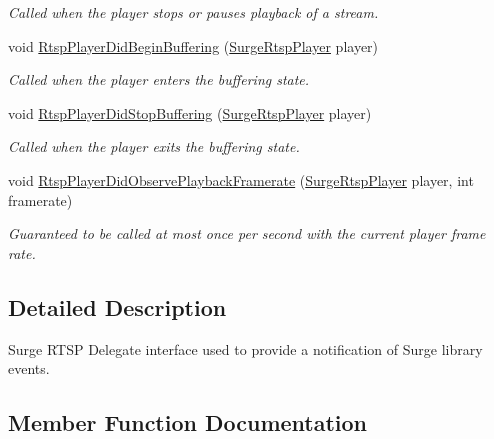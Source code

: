 \begin{DoxyCompactItemize}
\begin{DoxyCompactList}\small\item\em Called when the player stops or pauses playback of a stream. \end{DoxyCompactList}\item 
void \hyperlink{interface_surge_xamarini_o_s_bindings_1_1_surge_rtsp_player_delegate_a60aaf86b1f006e37c387d6dbe710977f}{Rtsp\+Player\+Did\+Begin\+Buffering} (\hyperlink{interface_surge_xamarini_o_s_bindings_1_1_surge_rtsp_player}{Surge\+Rtsp\+Player} player)
\begin{DoxyCompactList}\small\item\em Called when the player enters the buffering state. \end{DoxyCompactList}\item 
void \hyperlink{interface_surge_xamarini_o_s_bindings_1_1_surge_rtsp_player_delegate_ac178f502817c60bfe3a57b7393d66232}{Rtsp\+Player\+Did\+Stop\+Buffering} (\hyperlink{interface_surge_xamarini_o_s_bindings_1_1_surge_rtsp_player}{Surge\+Rtsp\+Player} player)
\begin{DoxyCompactList}\small\item\em Called when the player exits the buffering state. \end{DoxyCompactList}\item 
void \hyperlink{interface_surge_xamarini_o_s_bindings_1_1_surge_rtsp_player_delegate_a96ebb6b82e20ba68d1b91bee632efd06}{Rtsp\+Player\+Did\+Observe\+Playback\+Framerate} (\hyperlink{interface_surge_xamarini_o_s_bindings_1_1_surge_rtsp_player}{Surge\+Rtsp\+Player} player, int framerate)
\begin{DoxyCompactList}\small\item\em Guaranteed to be called at most once per second with the current player frame rate. \end{DoxyCompactList}\end{DoxyCompactItemize}


\subsection{Detailed Description}
Surge R\+T\+SP Delegate interface used to provide a notification of Surge library events. 



\subsection{Member Function Documentation}
\mbox{\label{interface_surge_xamarini_o_s_bindings_1_1_surge_rtsp_player_delegate_a60aaf86b1f006e37c387d6dbe710977f}} 
